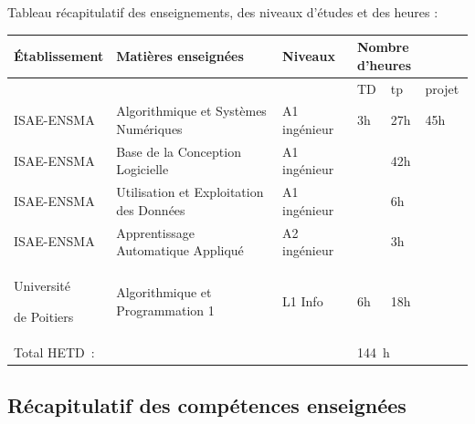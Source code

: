 \documentclass[11pt,a4paper,oneside]{article}
\begin{document}
Tableau récapitulatif des enseignements, des niveaux d'études et des heures :
\begin{center}
	\begin{tabular}{|p{2.5cm}|l|l|l|l|l|}
		\hline
		Établissement                      & Matières enseignées                     & Niveaux      & \multicolumn{3}{l|}{Nombre d'heures}                \\
		\hline
		                                   &                                         &              & TD                                   & tp  & projet \\
		\hline
		ISAE-ENSMA                         & Algorithmique et Systèmes Numériques    & A1 ingénieur & 3h                                   & 27h & 45h    \\
		\hline
		ISAE-ENSMA                         & Base de la Conception Logicielle        & A1 ingénieur &                                      & 42h &        \\
		\hline
		ISAE-ENSMA                         & Utilisation et Exploitation des Données & A1 ingénieur &                                      & 6h  &        \\
		\hline
		ISAE-ENSMA                         & Apprentissage Automatique Appliqué      & A2 ingénieur &                                      & 3h  &        \\
		\hline
		Université
		\par de Poitiers                   & Algorithmique et Programmation 1        & L1 Info      & 6h                                   & 18h &        \\
		\hline
		\multicolumn{3}{|l|}{Total HETD~:} & \multicolumn{3}{l|}{144~h}                                                                                   \\
		\hline
	\end{tabular}
\end{center}

\subsection{Récapitulatif des compétences enseignées}
\end{document}
